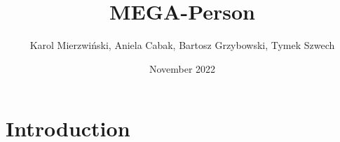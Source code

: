 \documentclass{article}
\title{MEGA-Person}
\author{Karol Mierzwiński, Aniela Cabak, Bartosz Grzybowski, Tymek Szwech}
\date{November 2022}
\begin{document}
\maketitle

\section{Introduction}





\end{document}
